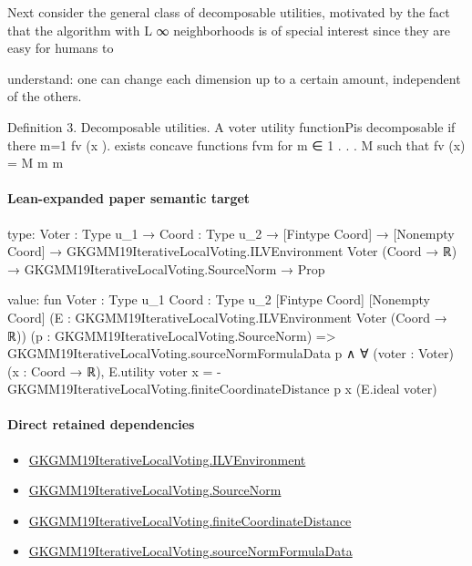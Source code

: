 \documentclass[10pt]{article}
\begin{document}
\begin{ReviewVerbatim}

Next consider the general class of decomposable utilities, motivated by the fact that the
algorithm with L
                  ∞ neighborhoods is of special interest since they are easy for humans to

understand: one can change each dimension up to a certain amount, independent of the
others.


Definition 3. Decomposable utilities. A voter utility functionPis decomposable if there
                                                                     m=1 fv (x ).
exists concave functions fvm for m ∈ {1 . . . M } such that fv (x) = M    m m
\end{ReviewVerbatim}



\paragraph{Lean-expanded paper semantic target}
\begin{ReviewVerbatim}
type:
{Voter : Type u_1} →
  {Coord : Type u_2} →
    [Fintype Coord] →
      [Nonempty Coord] →
        GKGMM19IterativeLocalVoting.ILVEnvironment Voter (Coord → ℝ) → GKGMM19IterativeLocalVoting.SourceNorm → Prop

value:
fun {Voter : Type u_1} {Coord : Type u_2} [Fintype Coord] [Nonempty Coord]
    (E : GKGMM19IterativeLocalVoting.ILVEnvironment Voter (Coord → ℝ)) (p : GKGMM19IterativeLocalVoting.SourceNorm) =>
  GKGMM19IterativeLocalVoting.sourceNormFormulaData p ∧
    ∀ (voter : Voter) (x : Coord → ℝ),
      E.utility voter x = -GKGMM19IterativeLocalVoting.finiteCoordinateDistance p x (E.ideal voter)
\end{ReviewVerbatim}

\paragraph{Direct retained dependencies}
\begin{itemize}\raggedright
\item \hyperlink{governing-declaration-df2ca62df1846667}{GKGMM19\allowbreak{}Iterative\allowbreak{}Local\allowbreak{}Voting.\allowbreak{}ILV\allowbreak{}Environment}
\item \hyperlink{governing-declaration-6fa4ab9852321b03}{GKGMM19\allowbreak{}Iterative\allowbreak{}Local\allowbreak{}Voting.\allowbreak{}Source\allowbreak{}Norm}
\item \hyperlink{governing-declaration-54228ebaec750c58}{GKGMM19\allowbreak{}Iterative\allowbreak{}Local\allowbreak{}Voting.\allowbreak{}finite\allowbreak{}Coordinate\allowbreak{}Distance}
\item \hyperlink{paper-prerequisite-d7774e2d1adfed0f}{GKGMM19\allowbreak{}Iterative\allowbreak{}Local\allowbreak{}Voting.\allowbreak{}source\allowbreak{}Norm\allowbreak{}Formula\allowbreak{}Data}
\end{itemize}
\end{document}
